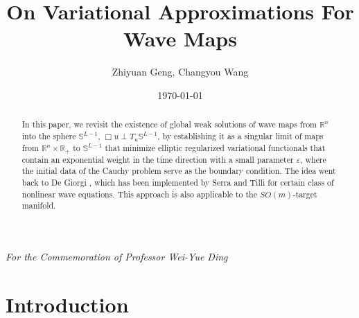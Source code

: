 \documentclass[12pt,twoside,reqno]{amsart}
\theoremstyle{definition}              %
\theoremstyle{remark}                  %
\newcommand{\R}{\mathbb{R}}                 %
\renewcommand{\1}{\mathbbm{1}}                                      %
\numberwithin{equation}{section}
\numberwithin{definition}{section}
\numberwithin{theorem}{section}
\numberwithin{remark}{section}
\begin{document}
\title{On Variational Approximations For Wave Maps}
\author{Zhiyuan Geng, Changyou Wang}
\address{Department of Mathematics, Purdue University, West Lafayette, IN 47907}
\begin{abstract} In this paper, we revisit the existence of global weak solutions of wave maps from $\R^n$ into the sphere $\mathbb{S}^{L-1}$, $\Box u\perp T_u \mathbb{S}^{L-1}$, by establishing it as a singular limit of maps from
$\R^n\times \R_+$ to $\mathbb S^{L-1}$ that minimize elliptic regularized variational functionals that contain an exponential weight in the time direction with a small parameter $\varepsilon$, where the initial data of the Cauchy problem serve as the boundary condition. The idea went back to De Giorgi \cite{Giorgi1996}, which has been implemented by Serra and Tilli \cite{Serra-Tilli2012, Serra-Tilli2016}
for certain class of nonlinear wave equations. This approach 
is also applicable to the $SO(m)$-target manifold. 
\end{abstract}
\date{\today}
\maketitle

\centerline{\it For the Commemoration of Professor Wei-Yue Ding}

\bigskip
\section{Introduction}
\end{document}
